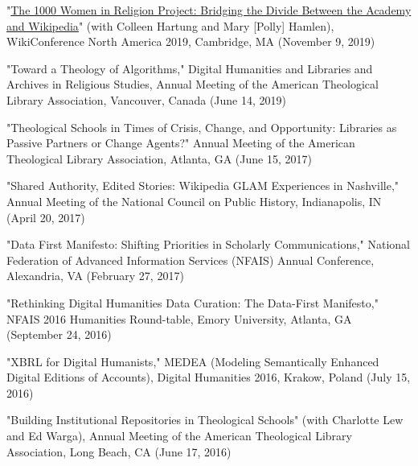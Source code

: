 \documentclass[]{res} %
\begin{document}
\begin{resume}
\begin{hangparas}{.25in}{1}"\href{https://wikiconference.org/wiki/Submissions:2019/The_1000_Women_in_Religion_Project:_Bridging_the_Divide_Between_the_Academy_and_Wikipedia}{The 1000 Women in Religion Project: Bridging the Divide Between the Academy and Wikipedia}" (with Colleen Hartung and Mary [Polly] Hamlen), WikiConference North America 2019, Cambridge, MA (November 9, 2019)\end{hangparas}

\begin{hangparas}{.25in}{1}"Toward a Theology of Algorithms," Digital Humanities and Libraries and Archives in Religious Studies, Annual Meeting of the American Theological Library Association, Vancouver, Canada (June 14, 2019)\end{hangparas}

\begin{hangparas}{.25in}{1}"Theological Schools in Times of Crisis, Change, and Opportunity: Libraries as Passive Partners or Change Agents?" Annual Meeting of the American Theological Library Association, Atlanta, GA (June 15, 2017)\end{hangparas}

\begin{hangparas}{.25in}{1}"Shared Authority, Edited Stories: Wikipedia GLAM Experiences in Nashville," Annual Meeting of the National Council on Public History, Indianapolis, IN (April 20, 2017)\end{hangparas}

\begin{hangparas}{.25in}{1}"Data First Manifesto: Shifting Priorities in Scholarly Communications," National Federation of Advanced Information Services (NFAIS) Annual Conference, Alexandria, VA (February 27, 2017)\end{hangparas}

\begin{hangparas}{.25in}{1}"Rethinking Digital Humanities Data Curation: The Data-First Manifesto," NFAIS 2016 Humanities Round-table, Emory University, Atlanta, GA (September 24, 2016)\end{hangparas}

\begin{hangparas}{.25in}{1}"XBRL for Digital Humanists," MEDEA (Modeling Semantically Enhanced Digital Editions of Accounts), Digital Humanities 2016, Krakow, Poland (July 15, 2016)\end{hangparas}

\begin{hangparas}{.25in}{1}"Building Institutional Repositories in Theological Schools" (with Charlotte Lew and Ed Warga), Annual Meeting of the American Theological Library Association, Long Beach, CA (June 17, 2016)\end{hangparas}


\end{resume}
\end{document}
